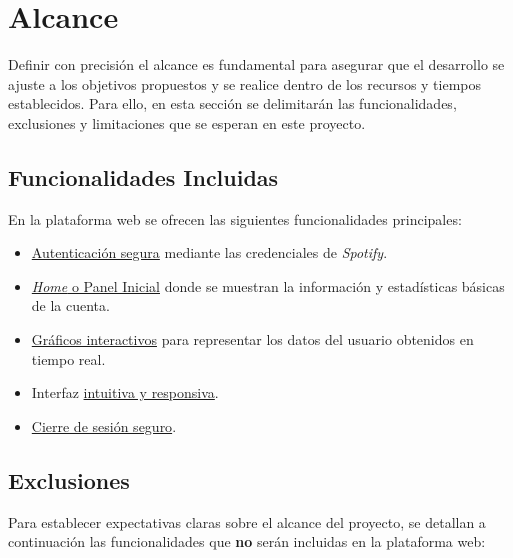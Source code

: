 \section{Alcance}

Definir con precisión el alcance es fundamental para asegurar que el desarrollo se ajuste a los objetivos propuestos y se realice dentro de los recursos y tiempos establecidos. Para ello, en esta sección se delimitarán las funcionalidades, exclusiones y limitaciones que se esperan en este proyecto.

\subsection{Funcionalidades Incluidas}

En la plataforma web se ofrecen las siguientes funcionalidades principales:

\begin{itemize}
    \item \underline{Autenticación segura} mediante las credenciales de \textit{Spotify}.
    \item \underline{\textit{Home} o Panel Inicial} donde se muestran la información y estadísticas básicas de la cuenta.
    \item \underline{Gráficos interactivos} para representar los datos del usuario obtenidos en tiempo real.
    \item Interfaz \underline{intuitiva y responsiva}.
    \item \underline{Cierre de sesión seguro}.
\end{itemize}

\subsection{Exclusiones}

Para establecer expectativas claras sobre el alcance del proyecto, se detallan a continuación las funcionalidades que \textbf{no} serán incluidas en la plataforma web:

